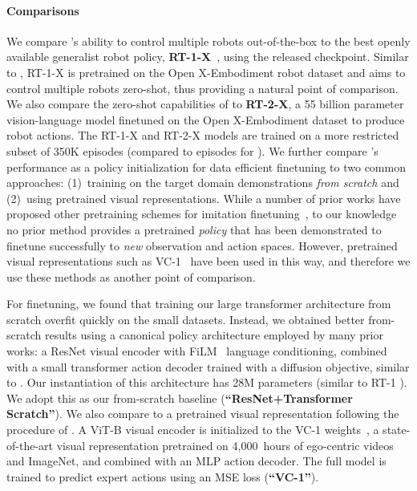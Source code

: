 \paragraph{Comparisons} We compare \method's ability to control multiple robots out-of-the-box to the best openly available generalist robot policy, \textbf{RT-1-X}~\citep{open_x_embodiment_rt_x_2023}, using the released checkpoint. Similar to \method, RT-1-X is pretrained on the Open X-Embodiment robot dataset and aims to control multiple robots zero-shot, thus providing a natural point of comparison. We also compare the zero-shot capabilities of \method{} to \textbf{RT-2-X}, a 55 billion parameter vision-language model finetuned on the Open X-Embodiment dataset to produce robot actions. The RT-1-X and RT-2-X models \citep{open_x_embodiment_rt_x_2023} are trained on a more restricted subset of 350K episodes (compared to \ntrajs{} episodes for \method).
We further compare \method's performance as a policy initialization for data efficient finetuning to two common approaches: (1)~training on the target domain demonstrations \emph{from scratch} and (2)~using pretrained visual representations. While a number of prior works have proposed other pretraining schemes for imitation finetuning~\citep{ebert2021bridge, Du2023BehaviorRF, fang2023rh20t}, to our knowledge no prior method provides a pretrained \emph{policy} that has been demonstrated to finetune successfully to \emph{new} observation and action spaces. However, pretrained visual representations such as VC-1~\citep{vc2023} have been used in this way, and therefore we use these methods as another point of comparison.

For finetuning, we found that training our large transformer architecture from scratch overfit quickly on the small datasets. Instead, we obtained better from-scratch results using a canonical policy architecture employed by many prior works: a ResNet visual encoder with FiLM~\citep{perez2018film} language conditioning, combined with a small transformer action decoder trained with a diffusion objective, similar to \citep{brohan2022rt,zhao2023learning,chi2023diffusionpolicy,lynch2023interactive}. Our instantiation of this architecture has 28M parameters (similar to RT-1 \cite{brohan2022rt}). We adopt this as our from-scratch baseline (\textbf{``ResNet+Transformer Scratch''}). We also compare to a pretrained visual representation following the procedure of \citet{majumdar2023we}. A ViT-B visual encoder is initialized to the VC-1 weights~\citep{majumdar2023we}, a state-of-the-art visual representation pretrained on 4,000~hours of ego-centric videos and ImageNet, and combined with an MLP action decoder. The full model is trained to predict expert actions using an MSE loss (\textbf{``VC-1''}).


